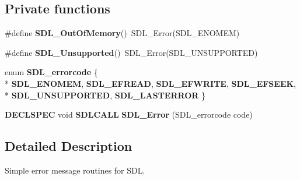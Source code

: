 \subsection*{Private functions}
\begin{DoxyCompactItemize}
\item 
\#define {\bfseries S\+D\+L\+\_\+\+Out\+Of\+Memory}()~S\+D\+L\+\_\+\+Error(S\+D\+L\+\_\+\+E\+N\+O\+M\+E\+M)\label{_s_d_l__error_8h_a440edcb93dba4e39c88ecf8dc676b6c1}

\item 
\#define {\bfseries S\+D\+L\+\_\+\+Unsupported}()~S\+D\+L\+\_\+\+Error(S\+D\+L\+\_\+\+U\+N\+S\+U\+P\+P\+O\+R\+T\+E\+D)\label{_s_d_l__error_8h_a45dc695e3a906dd40f00e204ace3bcf5}

\item 
enum {\bfseries S\+D\+L\+\_\+errorcode} \{ \\*
{\bfseries S\+D\+L\+\_\+\+E\+N\+O\+M\+E\+M}, 
{\bfseries S\+D\+L\+\_\+\+E\+F\+R\+E\+A\+D}, 
{\bfseries S\+D\+L\+\_\+\+E\+F\+W\+R\+I\+T\+E}, 
{\bfseries S\+D\+L\+\_\+\+E\+F\+S\+E\+E\+K}, 
\\*
{\bfseries S\+D\+L\+\_\+\+U\+N\+S\+U\+P\+P\+O\+R\+T\+E\+D}, 
{\bfseries S\+D\+L\+\_\+\+L\+A\+S\+T\+E\+R\+R\+O\+R}
 \}\label{_s_d_l__error_8h_a5c417ba725f086b33390a5e5d5dabfe1}

\item 
{\bf D\+E\+C\+L\+S\+P\+E\+C} void {\bf S\+D\+L\+C\+A\+L\+L} {\bfseries S\+D\+L\+\_\+\+Error} (S\+D\+L\+\_\+errorcode code)\label{_s_d_l__error_8h_a6555e5bb07af0a69c345366326897b22}

\end{DoxyCompactItemize}


\subsection{Detailed Description}
Simple error message routines for S\+D\+L. 


